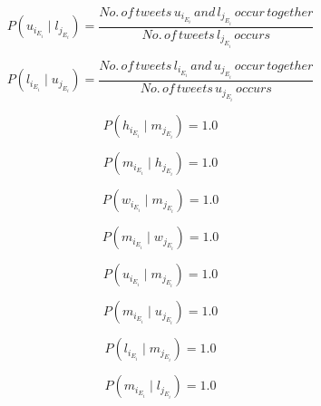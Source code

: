 \begin{equation}
P(u_{i_{E_{i}}} \mid l_{j_{E_{i}}}) = \frac{No. \, of \, tweets  \, u_{i_{E_{i}}} \, and \, l_{j_{E_{i}}} \, occur \, together}{No. \, of \, tweets  \, l_{j_{E_{i}}} \, occurs}
\end{equation}

\begin{equation}
P(l_{i_{E_{i}}} \mid u_{j_{E_{i}}}) = \frac{No. \, of \, tweets  \, l_{i_{E_{i}}} \, and \, u_{j_{E_{i}}} \, occur \, together}{No. \, of \, tweets  \, u_{j_{E_{i}}} \, occurs}
\end{equation}

\begin{equation}
P(h_{i_{E_{i}}} \mid m_{j_{E_{i}}}) = 1.0
\end{equation}

\begin{equation}
P(m_{i_{E_{i}}} \mid h_{j_{E_{i}}}) = 1.0
\end{equation}

\begin{equation}
P(w_{i_{E_{i}}} \mid m_{j_{E_{i}}}) = 1.0
\end{equation}

\begin{equation}
P(m_{i_{E_{i}}} \mid w_{j_{E_{i}}}) = 1.0
\end{equation}

\begin{equation}
P(u_{i_{E_{i}}} \mid m_{j_{E_{i}}}) = 1.0
\end{equation}

\begin{equation}
P(m_{i_{E_{i}}} \mid u_{j_{E_{i}}}) = 1.0
\end{equation}

\begin{equation}
P(l_{i_{E_{i}}} \mid m_{j_{E_{i}}}) = 1.0
\end{equation}

\begin{equation}
P(m_{i_{E_{i}}} \mid l_{j_{E_{i}}}) = 1.0
\end{equation}





